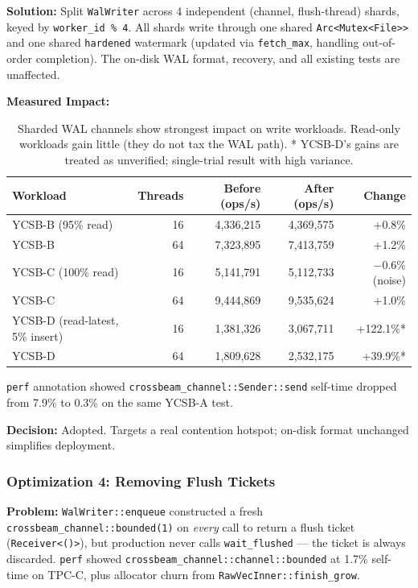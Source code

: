 \documentclass[11pt]{article}
\newcommand{\code}[1]{\texttt{#1}}
\begin{document}
\textbf{Solution:}
Split \code{WalWriter} across 4 independent (channel, flush-thread) shards, keyed by
\code{worker\_id \% 4}. All shards write through one shared \code{Arc<Mutex<File>>}
and one shared \code{hardened} watermark (updated via \code{fetch\_max}, handling
out-of-order completion). The on-disk WAL format, recovery, and all existing tests are
unaffected.

\textbf{Measured Impact:}

\begin{table}[h]
\centering
\small
\begin{tabular}{lrrrr}
\toprule
\textbf{Workload} & \textbf{Threads} & \textbf{Before (ops/s)} & \textbf{After (ops/s)} & \textbf{Change} \\
\midrule
YCSB-B (95\% read) & 16 & 4,336,215 & 4,369,575 & +0.8\% \\
YCSB-B & 64 & 7,323,895 & 7,413,759 & +1.2\% \\
YCSB-C (100\% read) & 16 & 5,141,791 & 5,112,733 & −0.6\% (noise) \\
YCSB-C & 64 & 9,444,869 & 9,535,624 & +1.0\% \\
YCSB-D (read-latest, 5\% insert) & 16 & 1,381,326 & 3,067,711 & +122.1\%* \\
YCSB-D & 64 & 1,809,628 & 2,532,175 & +39.9\%* \\
\bottomrule
\end{tabular}
\caption{Sharded WAL channels show strongest impact on write workloads. Read-only workloads
gain little (they do not tax the WAL path). * YCSB-D's gains are treated as unverified;
single-trial result with high variance.}
\label{tab:wal_sharding}
\end{table}

\code{perf} annotation showed \code{crossbeam\_channel::Sender::send} self-time
dropped from 7.9\% to 0.3\% on the same YCSB-A test.

\textbf{Decision:} Adopted. Targets a real contention hotspot; on-disk format unchanged
simplifies deployment.

\subsubsection{Optimization 4: Removing Flush Tickets}
\label{sec:wal_tickets}

\textbf{Problem:}
\code{WalWriter::enqueue} constructed a fresh \code{crossbeam\_channel::bounded(1)} on
\emph{every} call to return a flush ticket (\code{Receiver<()>}), but production never
calls \code{wait\_flushed} --- the ticket is always discarded. \code{perf} showed
\code{crossbeam\_channel::channel::bounded} at 1.7\% self-time on TPC-C, plus allocator
churn from \code{RawVecInner::finish\_grow}.
\end{document}
